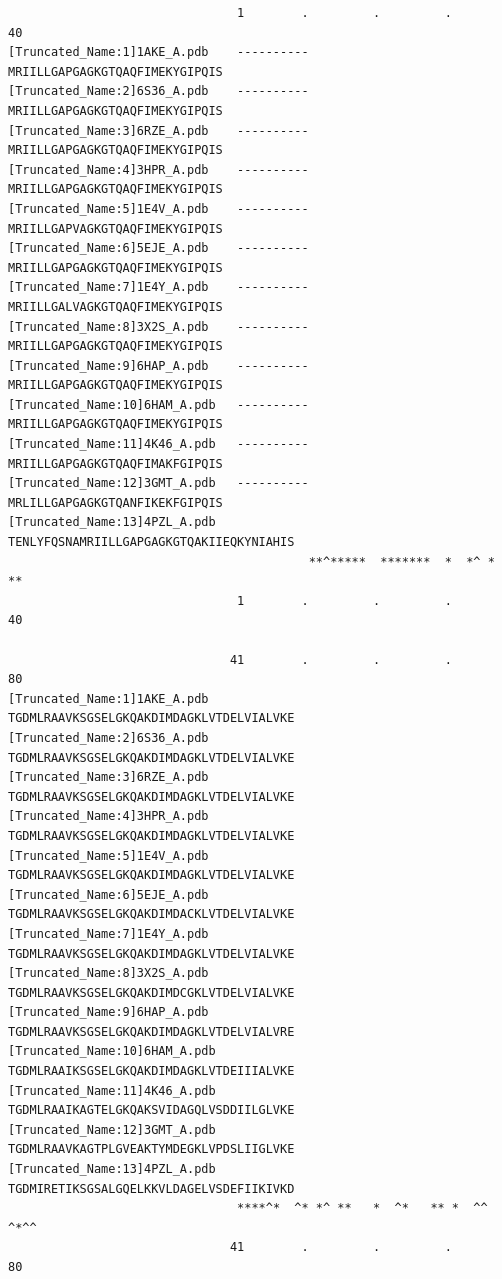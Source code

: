 \documentclass[
  letterpaper,
  DIV=11,
  numbers=noendperiod]{scrartcl}
\begin{document}
\begin{verbatim}
                                1        .         .         .         40 
[Truncated_Name:1]1AKE_A.pdb    ----------MRIILLGAPGAGKGTQAQFIMEKYGIPQIS
[Truncated_Name:2]6S36_A.pdb    ----------MRIILLGAPGAGKGTQAQFIMEKYGIPQIS
[Truncated_Name:3]6RZE_A.pdb    ----------MRIILLGAPGAGKGTQAQFIMEKYGIPQIS
[Truncated_Name:4]3HPR_A.pdb    ----------MRIILLGAPGAGKGTQAQFIMEKYGIPQIS
[Truncated_Name:5]1E4V_A.pdb    ----------MRIILLGAPVAGKGTQAQFIMEKYGIPQIS
[Truncated_Name:6]5EJE_A.pdb    ----------MRIILLGAPGAGKGTQAQFIMEKYGIPQIS
[Truncated_Name:7]1E4Y_A.pdb    ----------MRIILLGALVAGKGTQAQFIMEKYGIPQIS
[Truncated_Name:8]3X2S_A.pdb    ----------MRIILLGAPGAGKGTQAQFIMEKYGIPQIS
[Truncated_Name:9]6HAP_A.pdb    ----------MRIILLGAPGAGKGTQAQFIMEKYGIPQIS
[Truncated_Name:10]6HAM_A.pdb   ----------MRIILLGAPGAGKGTQAQFIMEKYGIPQIS
[Truncated_Name:11]4K46_A.pdb   ----------MRIILLGAPGAGKGTQAQFIMAKFGIPQIS
[Truncated_Name:12]3GMT_A.pdb   ----------MRLILLGAPGAGKGTQANFIKEKFGIPQIS
[Truncated_Name:13]4PZL_A.pdb   TENLYFQSNAMRIILLGAPGAGKGTQAKIIEQKYNIAHIS
                                          **^*****  *******  *  *^ *  ** 
                                1        .         .         .         40 

                               41        .         .         .         80 
[Truncated_Name:1]1AKE_A.pdb    TGDMLRAAVKSGSELGKQAKDIMDAGKLVTDELVIALVKE
[Truncated_Name:2]6S36_A.pdb    TGDMLRAAVKSGSELGKQAKDIMDAGKLVTDELVIALVKE
[Truncated_Name:3]6RZE_A.pdb    TGDMLRAAVKSGSELGKQAKDIMDAGKLVTDELVIALVKE
[Truncated_Name:4]3HPR_A.pdb    TGDMLRAAVKSGSELGKQAKDIMDAGKLVTDELVIALVKE
[Truncated_Name:5]1E4V_A.pdb    TGDMLRAAVKSGSELGKQAKDIMDAGKLVTDELVIALVKE
[Truncated_Name:6]5EJE_A.pdb    TGDMLRAAVKSGSELGKQAKDIMDACKLVTDELVIALVKE
[Truncated_Name:7]1E4Y_A.pdb    TGDMLRAAVKSGSELGKQAKDIMDAGKLVTDELVIALVKE
[Truncated_Name:8]3X2S_A.pdb    TGDMLRAAVKSGSELGKQAKDIMDCGKLVTDELVIALVKE
[Truncated_Name:9]6HAP_A.pdb    TGDMLRAAVKSGSELGKQAKDIMDAGKLVTDELVIALVRE
[Truncated_Name:10]6HAM_A.pdb   TGDMLRAAIKSGSELGKQAKDIMDAGKLVTDEIIIALVKE
[Truncated_Name:11]4K46_A.pdb   TGDMLRAAIKAGTELGKQAKSVIDAGQLVSDDIILGLVKE
[Truncated_Name:12]3GMT_A.pdb   TGDMLRAAVKAGTPLGVEAKTYMDEGKLVPDSLIIGLVKE
[Truncated_Name:13]4PZL_A.pdb   TGDMIRETIKSGSALGQELKKVLDAGELVSDEFIIKIVKD
                                ****^*  ^* *^ **   *  ^*   ** *  ^^ ^*^^ 
                               41        .         .         .         80 


\end{verbatim}
\end{document}
